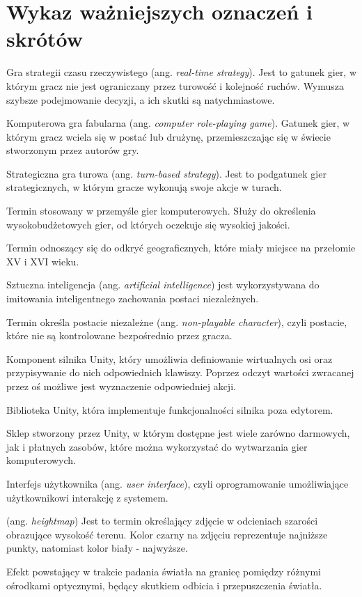 \chapter*{Wykaz ważniejszych oznaczeń i skrótów}
\begin{description}[style=multiline,leftmargin=3cm]
\item[RTS] Gra strategii czasu rzeczywistego (ang. \textit{real-time strategy}). Jest to gatunek gier, w którym gracz nie jest
ograniczany przez turowość i kolejność ruchów. Wymusza szybsze podejmowanie decyzji, a ich skutki są natychmiastowe.
\item[cRPG] Komputerowa gra fabularna (ang. \textit{computer role-playing game}). Gatunek gier, w którym gracz wciela
się w postać lub drużynę, przemieszczając się w świecie stworzonym przez autorów gry.
\item[TBS] Strategiczna gra turowa (ang. \textit{turn-based strategy}). Jest to podgatunek gier strategicznych, w którym
gracze wykonują swoje akcje w turach.
\item[AAA (Triple-A)] Termin stosowany w przemyśle gier komputerowych. Służy do określenia wysokobudżetowych gier, od
których oczekuje się wysokiej jakości.
\item[Wielkie odkrycia geograficzne] Termin odnoszący się do odkryć geograficznych, które miały miejsce na przełomie XV
i XVI wieku.
\item[AI] Sztuczna inteligencja (ang. \textit{artificial intelligence}) jest wykorzystywana do imitowania inteligentnego
zachowania postaci niezależnych.
\item[NPC] Termin określa postacie niezależne (ang. \textit{non-playable character}), czyli postacie, które nie są kontrolowane bezpośrednio
przez gracza.
\item[Input Manager] Komponent silnika Unity, który umożliwia definiowanie wirtualnych osi oraz przypisywanie do nich
odpowiednich klawiszy. Poprzez odczyt wartości zwracanej przez oś możliwe jest wyznaczenie odpowiedniej akcji.
\item[Unity Runtime] Biblioteka Unity, która implementuje funkcjonalności silnika poza edytorem.
\item[Asset Store] Sklep stworzony przez Unity, w którym dostępne jest wiele zarówno darmowych, jak i płatnych zasobów,
które można wykorzystać do wytwarzania gier komputerowych.
\item[UI] Interfejs użytkownika (ang. \textit{user interface}), czyli oprogramowanie umożliwiające użytkownikowi
interakcję z systemem.
\item[Mapa wysokości] (ang. \textit{heightmap}) Jest to termin określający zdjęcie w odcieniach szarości obrazujące
wysokość terenu. Kolor czarny na zdjęciu reprezentuje najniższe punkty, natomiast kolor biały - najwyższe.
\item[Efekt Fresnela] Efekt powstający w trakcie padania światła na granicę pomiędzy różnymi ośrodkami optycznymi,
będący skutkiem odbicia i przepuszczenia światła.
\end{description}
